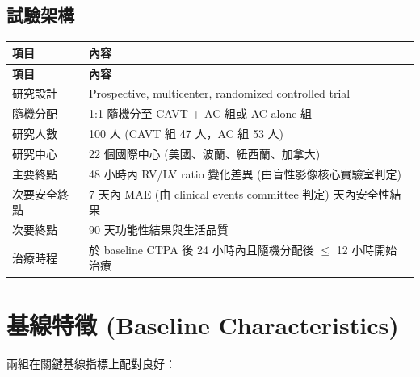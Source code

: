 \documentclass[11pt,a4paper]{article}
\begin{document}
\subsection{試驗架構}

\begin{longtable}{p{4cm}p{10cm}}
\toprule
\textbf{項目} & \textbf{內容} \\
\midrule
\endfirsthead
\toprule
\textbf{項目} & \textbf{內容} \\
\midrule
\endhead
\bottomrule
\endfoot
研究設計 & Prospective, multicenter, randomized controlled trial \\
\midrule
隨機分配 & 1:1 隨機分至 CAVT + AC 組或 AC alone 組 \\
\midrule
研究人數 & 100 人 (CAVT 組 47 人，AC 組 53 人) \\
\midrule
研究中心 & 22 個國際中心 (美國、波蘭、紐西蘭、加拿大) \\
\midrule
主要終點 & 48 小時內 RV/LV ratio 變化差異 (由盲性影像核心實驗室判定) \\
\midrule
次要安全終點 & 7 天內 MAE (由 clinical events committee 判定)\newline 90 天內安全性結果 \\
\midrule
次要終點 & 90 天功能性結果與生活品質 \\
\midrule
治療時程 & 於 baseline CTPA 後 24 小時內且隨機分配後 $\leq$ 12 小時開始治療 \\
\bottomrule
\end{longtable}

\section{基線特徵 (Baseline Characteristics)}

兩組在關鍵基線指標上配對良好：
\end{document}
